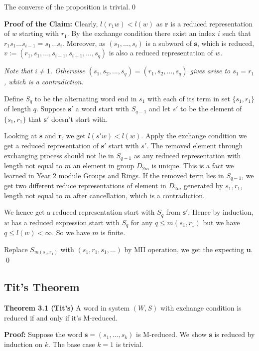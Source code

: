 \documentclass[../main.tex]{subfiles}
\begin{document}
The converse of the proposition is trivial.\qed

\vspace{\baselineskip}
\noindent \textbf{Proof of the Claim:} Clearly, $l(r_1w) < l(w)$ as $\mathbf{r}$ is a reduced representation of $w$ starting with $r_1$. By the exchange condition there exist an index $i$ such that $r_1s_1...s_{i-1}=s_1...s_i$. Moreover, as $(s_1,...,s_i)$ is a subword of $\mathbf{s}$, which is reduced, $v:=(r_1,s_1,...,s_{i-1},s_{i+1},...,s_q)$ is also a reduced representation of $w$. 

\textit{Note that $i \ne 1$. Otherwise $(s_1,s_2,...,s_q)=(r_1,s_2,...,s_q)$ gives arise to $s_1=r_1$, which is a contradiction. }

Define $S_q$ to be the alternating word end in $s_1$ with each of its term in set $\{s_1,r_1\}$ of length $q$. Suppose $\mathbf{s'}$ a word start with $S_{q-1}$ and let $s'$ to be the element of $\{s_1,r_1\}$ that $\mathbf{s'}$ doesn't start with. 

Looking at $\mathbf{s}$ and $\mathbf{r}$, we get $l(s'w)<l(w)$. Apply the exchange condition we get a reduced representation of $\mathbf{s'}$ start with $s'$. The removed element through exchanging process should not lie in $S_{q-1}$ as any reduced representation with length not equal to $m$ an element in group $D_{2m}$ is unique. This is a fact we learned in Year 2 module Groups and Rings. If the removed term lies in $S_{q-1}$, we get two different reduce representations of element in $D_{2m}$ generated by $s_1,r_1$, length not equal to $m$ after cancellation, which is a contradiction. 

We hence get a reduced representation start with $S_q$ from $\mathbf{s'}$. Hence by induction, $w$ has a reduced expression start with $S_q$ for any $q \le m(s_1,r_1)$ but we have $q \le l(w) < \infty$. So we have $m$ is finite. 

Replace $S_{m(s_1,r_1)}$ with $(s_1,r_1,s_1,...)$ by MII operation, we get the expecting $\mathbf{u}$. \qed 

\subsection{Tit's Theorem}
\noindent \textbf{Theorem 3.1 (Tit's)} A word in system $(W,S)$ with exchange condition is reduced if and only if it's M-reduced. 

\vspace{0.5\baselineskip}
\noindent \textbf{Proof:} Suppose the word $\mathbf{s}=(s_1,...,s_k)$ is M-reduced. We show $\mathbf{s}$ is reduced by induction on $k$. The base case $k=1$ is trivial. 
\end{document}
